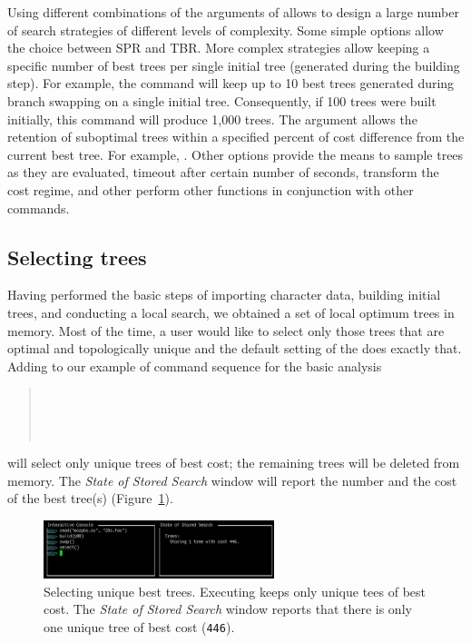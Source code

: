 Using different combinations of the arguments of  allows to design a  large number of search strategies of different levels of complexity. Some simple options allow the choice between SPR and TBR. More complex strategies allow keeping a specific number of best trees per single initial tree (generated during the building step). For example, the command  will keep up to 10 best trees generated during branch swapping on a single initial tree. Consequently, if 100 trees were built initially, this command will produce 1,000 trees. The argument  allows the retention of suboptimal trees within a specified percent of cost difference from the current best tree. For example, . Other options provide the means to sample trees as they are evaluated, timeout after certain number of seconds, transform the cost regime, and other perform other functions in conjunction with other \poy commands.

\subsection{Selecting trees}

Having performed the basic steps of importing character data, building initial trees, and conducting a local search, we obtained a set of local optimum trees in memory. Most of the time, a user would like to select only those trees that are optimal and topologically unique and the default setting of the  does exactly that. Adding  to our example of command sequence for the basic analysis 
\begin{quote}
 	\\
 	\\
	\\
\end{quote}
will select only unique trees of best cost; the remaining trees will be deleted from memory. The \emph{State of Stored Search} window will report the number and the cost of the best tree(s) (Figure~\ref{fig:select}).

\begin{figure}[]
    \begin{center}
        \includegraphics[width=0.6\textwidth]{figures/select.jpg}
    \end{center}
    \caption{Selecting unique best trees. Executing  keeps only unique tees of best cost. The \emph{State of Stored Search} window reports that there is only one unique tree of best cost (\texttt{446}).}
    \label{fig:select}
\end{figure}

